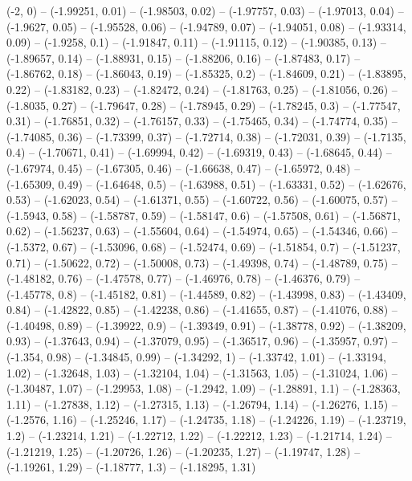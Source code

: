 \drawBand (-2, 0)
-- (-1.99251, 0.01)
-- (-1.98503, 0.02)
-- (-1.97757, 0.03)
-- (-1.97013, 0.04)
-- (-1.9627, 0.05)
-- (-1.95528, 0.06)
-- (-1.94789, 0.07)
-- (-1.94051, 0.08)
-- (-1.93314, 0.09)
-- (-1.9258, 0.1)
-- (-1.91847, 0.11)
-- (-1.91115, 0.12)
-- (-1.90385, 0.13)
-- (-1.89657, 0.14)
-- (-1.88931, 0.15)
-- (-1.88206, 0.16)
-- (-1.87483, 0.17)
-- (-1.86762, 0.18)
-- (-1.86043, 0.19)
-- (-1.85325, 0.2)
-- (-1.84609, 0.21)
-- (-1.83895, 0.22)
-- (-1.83182, 0.23)
-- (-1.82472, 0.24)
-- (-1.81763, 0.25)
-- (-1.81056, 0.26)
-- (-1.8035, 0.27)
-- (-1.79647, 0.28)
-- (-1.78945, 0.29)
-- (-1.78245, 0.3)
-- (-1.77547, 0.31)
-- (-1.76851, 0.32)
-- (-1.76157, 0.33)
-- (-1.75465, 0.34)
-- (-1.74774, 0.35)
-- (-1.74085, 0.36)
-- (-1.73399, 0.37)
-- (-1.72714, 0.38)
-- (-1.72031, 0.39)
-- (-1.7135, 0.4)
-- (-1.70671, 0.41)
-- (-1.69994, 0.42)
-- (-1.69319, 0.43)
-- (-1.68645, 0.44)
-- (-1.67974, 0.45)
-- (-1.67305, 0.46)
-- (-1.66638, 0.47)
-- (-1.65972, 0.48)
-- (-1.65309, 0.49)
-- (-1.64648, 0.5)
-- (-1.63988, 0.51)
-- (-1.63331, 0.52)
-- (-1.62676, 0.53)
-- (-1.62023, 0.54)
-- (-1.61371, 0.55)
-- (-1.60722, 0.56)
-- (-1.60075, 0.57)
-- (-1.5943, 0.58)
-- (-1.58787, 0.59)
-- (-1.58147, 0.6)
-- (-1.57508, 0.61)
-- (-1.56871, 0.62)
-- (-1.56237, 0.63)
-- (-1.55604, 0.64)
-- (-1.54974, 0.65)
-- (-1.54346, 0.66)
-- (-1.5372, 0.67)
-- (-1.53096, 0.68)
-- (-1.52474, 0.69)
-- (-1.51854, 0.7)
-- (-1.51237, 0.71)
-- (-1.50622, 0.72)
-- (-1.50008, 0.73)
-- (-1.49398, 0.74)
-- (-1.48789, 0.75)
-- (-1.48182, 0.76)
-- (-1.47578, 0.77)
-- (-1.46976, 0.78)
-- (-1.46376, 0.79)
-- (-1.45778, 0.8)
-- (-1.45182, 0.81)
-- (-1.44589, 0.82)
-- (-1.43998, 0.83)
-- (-1.43409, 0.84)
-- (-1.42822, 0.85)
-- (-1.42238, 0.86)
-- (-1.41655, 0.87)
-- (-1.41076, 0.88)
-- (-1.40498, 0.89)
-- (-1.39922, 0.9)
-- (-1.39349, 0.91)
-- (-1.38778, 0.92)
-- (-1.38209, 0.93)
-- (-1.37643, 0.94)
-- (-1.37079, 0.95)
-- (-1.36517, 0.96)
-- (-1.35957, 0.97)
-- (-1.354, 0.98)
-- (-1.34845, 0.99)
-- (-1.34292, 1)
-- (-1.33742, 1.01)
-- (-1.33194, 1.02)
-- (-1.32648, 1.03)
-- (-1.32104, 1.04)
-- (-1.31563, 1.05)
-- (-1.31024, 1.06)
-- (-1.30487, 1.07)
-- (-1.29953, 1.08)
-- (-1.2942, 1.09)
-- (-1.28891, 1.1)
-- (-1.28363, 1.11)
-- (-1.27838, 1.12)
-- (-1.27315, 1.13)
-- (-1.26794, 1.14)
-- (-1.26276, 1.15)
-- (-1.2576, 1.16)
-- (-1.25246, 1.17)
-- (-1.24735, 1.18)
-- (-1.24226, 1.19)
-- (-1.23719, 1.2)
-- (-1.23214, 1.21)
-- (-1.22712, 1.22)
-- (-1.22212, 1.23)
-- (-1.21714, 1.24)
-- (-1.21219, 1.25)
-- (-1.20726, 1.26)
-- (-1.20235, 1.27)
-- (-1.19747, 1.28)
-- (-1.19261, 1.29)
-- (-1.18777, 1.3)
-- (-1.18295, 1.31)
